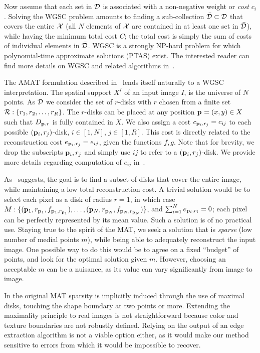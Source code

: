 \documentclass[10pt,twocolumn,letterpaper]{article}
\begin{document}
Now assume that each set in $\mathcal{D}$ is associated with a non-negative weight or \emph{cost} $c_i$.
Solving the WGSC problem amounts to finding a sub-collection $\bar{\mathcal{D}} \subset \mathcal{D}$ that covers the entire $\mathcal{X}$
(all $N$ elements of $\mathcal{X}$ are contained in at least one set in $\bar{\mathcal{D}}$), while having the minimum
total cost $C$; the total cost is simply the sum of costs of individual elements in $\bar{\mathcal{D}}$.
WGSC is a strongly NP-hard problem for which polynomial-time approximate solutions (PTAS) exist.
The interested reader can find more details on WGSC and related algorithms 
in~\cite{mustafa2015quasi,varadarajan2010weighted,har2012weighted,chan2012weighted}.

The AMAT formulation described in~ lends itself naturally to a 
WGSC interpretation.
The spatial support $X^I$ of an input image $I$, is the universe of $N$ points.
As $\mathcal{D}$ we consider the set of $r$-disks with $r$ chosen from a finite set $\mathcal{R}:\{r_1,r_2,\ldots,r_R\}$.
The $r$-disks can be placed at any position $\mathbf{p}_{}=(x,y)\in X$ such that $D_{\mathbf{p}_{},r}$ is fully contained in $X$.
We also assign a cost $c_{\mathbf{p}_{i},r_j} = c_{ij}$ to each possible $(\mathbf{p}_{i},r_j)$-disk, $i\in[1,N],\, j\in[1,R]$.
This cost is directly related to the reconstruction cost 
$e_{\mathbf{p}_{i},r_j} = e_{ij}$, given the functions $f,g$.
Note that for brevity, we drop the subscripts $\mathbf{p}_{i},r_j$ and simply use $ij$ to refer to a $(\mathbf{p}_{i},r_j)$-disk.
We provide more details regarding computation of $e_{ij}$ in~.

As~ suggests, the goal is to find a subset of disks that cover the entire image, while maintaining
a low total reconstruction cost. 
A trivial solution would be to select each pixel as a disk of radius $r=1$, in which case
$M:\{ (\mathbf{p}_{1},r_{\mathbf{p}_{1}},f_{\mathbf{p}_{1},r_{\mathbf{p}_{1}}}), \ldots, ( \mathbf{p}_{N},r_{\mathbf{p}_{N}},f_{\mathbf{p}_{N},r_{\mathbf{p}_{N}}} ) \}$,
and $\sum_{i=1}^N e_{\mathbf{p}_{i},r_i} = 0$; each pixel can be perfectly represented by its mean value.
Such a solution is of no practical use. 
Staying true to the spirit of the MAT, we seek a solution that is \emph{sparse}
(low number of medial points $m$), while being able to adequately reconstruct the input image.
One possible way to do this would be to agree on a fixed ``budget'' of points, and look for the 
optimal solution given $m$.
However, choosing an acceptable $m$ can be a nuisance, as its value can vary significantly  from image to image.

In the original MAT sparsity is implicitly induced through the use of maximal disks,
touching the shape boundary at two points or more.
Extending the maximality principle to real images is not straightforward
because color and texture boundaries are not robustly defined.
Relying on the output of an edge extraction algorithm is not a viable option either,
as it would make our method sensitive to errors from which it would be impossible to recover.
\end{document}
